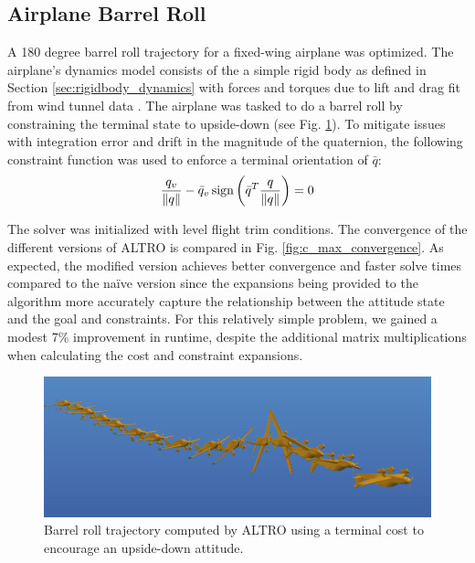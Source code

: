 \documentclass[letterpaper, 10 pt, conference]{ieeeconf}  %
\DeclareMathOperator{\sign}{sign}
\newcommand{\todo}[1]{\textcolor{red}{TODO: #1}}
\begin{document}
    \subsection{Airplane Barrel Roll}

        A 180 degree barrel roll trajectory for a fixed-wing airplane was optimized. The
        airplane's dynamics model consists of the a simple rigid body as defined in
        Section \ref{sec:rigidbody_dynamics} with forces and torques due to lift and drag
        fit from wind tunnel data \cite{manchester2016udp}. The airplane was tasked to do
        a barrel roll by constraining the terminal state to upside-down (see Fig.
        \ref{fig:barrellroll}). To mitigate issues with integration error and drift in the magnitude of the quaternion,
        the following constraint function was used to enforce a terminal orientation of $\bar{q}$:
        \begin{equation}
            \frac{q_v}{\norm{q}} - \bar{q}_v
                \sign\left(\bar{q}^T \frac{q }{ \norm{q}}\right) = 0
        \end{equation}

        The solver was initialized with level flight trim
        conditions. The convergence of the different versions of ALTRO is compared in
        Fig. \ref{fig:c_max_convergence}. As expected, the modified version achieves
        better convergence and faster solve times compared to the na\"ive version since
        the expansions being provided to the algorithm more accurately capture the
        relationship between the attitude state and the goal and constraints. For this 
        relatively simple problem, we gained a modest 7\% improvement in runtime, despite
        the additional matrix multiplications when calculating the cost and constraint
        expansions.

        \begin{figure}[ht]
            \centering
            \includegraphics[width=\columnwidth]{figures/barrellroll.png}
            \caption{Barrel roll trajectory computed by ALTRO using a terminal cost to encourage an upside-down attitude.}
            \label{fig:barrellroll}
        \end{figure}
\end{document}
